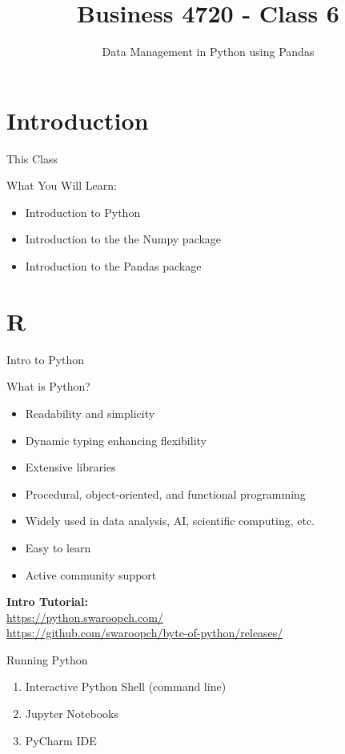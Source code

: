 \documentclass[ignorenonframetext,xcolor=x11names]{beamer}
\title{Business 4720 - Class 6}
\subtitle{Data Management in Python using Pandas}
\begin{document}
\begin{frame}{}
  \titlepage
  \footnotesize
  
\end{frame}

\section{Introduction}

\begin{frame}{This Class}

\begin{block}{What You Will Learn:}
\begin{itemize}
  \item Introduction to Python
  \item Introduction to the the Numpy package
  \item Introduction to the Pandas package
\end{itemize}
\end{block}
\end{frame}

\section{R}

\begin{frame}{Intro to Python}
\begin{block}{What is Python?}
\begin{itemize}
    \item Readability and simplicity
    \item Dynamic typing enhancing flexibility
    \item Extensive libraries
    \item Procedural, object-oriented, and functional programming
    \item Widely used in data analysis, AI, scientific computing, etc.
    \item Easy to learn
    \item Active community support
\end{itemize}
\end{block}
\vspace{3mm}
\textbf{Intro Tutorial:} \\
\url{https://python.swaroopch.com/} \\
\url{https://github.com/swaroopch/byte-of-python/releases/}
\end{frame}


\begin{frame}{Running Python}
\begin{enumerate}
    \item Interactive Python Shell (command line)
    \item Jupyter Notebooks
    \item PyCharm IDE
\end{enumerate}
\end{frame}
\end{document}
